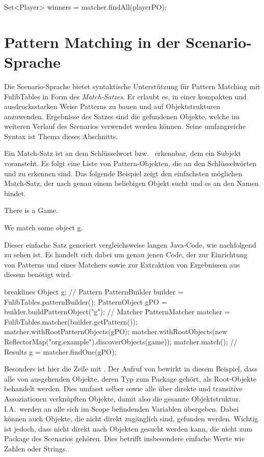 \begin{jcodeblock}
    Set<Player> winners = matcher.findAll(playerPO);
\end{jcodeblock}

\section{Pattern Matching in der Scenario-Sprache}\label{sec:scenario-pattern-matching}

Die Scenario-Sprache bietet syntaktische Unterstützung für Pattern Matching mit FulibTables in Form des \emph{Match-Satzes}.
Er erlaubt es, in einer kompakten und ausdrucksstarken Weise Patterns zu bauen und auf Objektstrukturen anzuwenden.
Ergebnisse des Satzes sind die gefundenen Objekte, welche im weiteren Verlauf des Scenarios verwendet werden können.
Seine umfangreiche Syntax ist Thema dieses Abschnitts.

Ein Match-Satz ist an dem Schlüsselwort  bzw.\  erkennbar, dem ein Subjekt voransteht.
Es folgt eine Liste von Pattern-Objekten, die an den Schlüsselwörten  und  zu erkennen sind.
Das folgende Beispiel zeigt den einfachsten möglichen Match-Satz, der nach genau einem beliebigen Objekt sucht und es an den Namen  bindet.

\begin{mdcodeblock}
    There is a Game.

    We match some object g.
\end{mdcodeblock}

Dieser einfache Satz generiert vergleichsweise langen Java-Code, wie nachfolgend zu sehen ist.
Es handelt sich dabei um genau jenen Code, der zur Einrichtung von Patterns und eines Matchers sowie zur Extraktion von Ergebnissen aus diesem benötigt wird.

\begin{jcodeblock*}{breaklines}
    Object g;
    {
        // Pattern
        PatternBuilder builder = FulibTables.patternBuilder();
        PatternObject gPO = builder.buildPatternObject("g");
        // Matcher
        PatternMatcher matcher = FulibTables.matcher(builder.getPattern());
        matcher.withRootPatternObjects(gPO);
        matcher.withRootObjects(new ReflectorMap("org.example").discoverObjects(game));
        matcher.match();
        // Results
        g = matcher.findOne(gPO);
    }
\end{jcodeblock*}

Besonders ist hier die Zeile mit .
Der Aufruf von  bewirkt in diesem Beispiel, dass alle von  ausgehenden Objekte, deren Typ zum Package  gehört, als Root-Objekte behandelt werden.
Dies umfasst  selber sowie alle über direkte und transitive Assoziationen verknüpften Objekte, damit also die gesamte Objektstruktur.
I.A.\ werden an  alle sich im Scope befindenden Variablen übergeben.
Dabei können auch Objekte, die nicht direkt zugänglich sind, gefunden werden.
Wichtig ist jedoch, dass nicht direkt nach Objekten gesucht werden kann, die nicht zum Package des Scenarios gehören.
Dies betrifft insbesondere einfache Werte wie Zahlen oder Strings.

